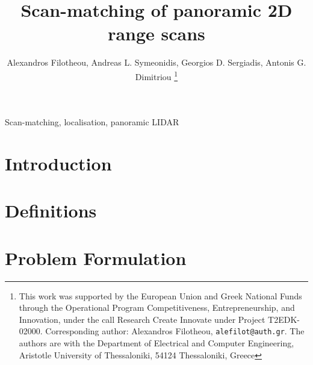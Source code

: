 \documentclass[letterpaper, 10 pt, conference]{ieeeconf}
\begin{document}
\title{\LARGE \bf Scan-matching of panoramic 2D range scans}


\author{Alexandros Filotheou, Andreas L. Symeonidis, Georgios D. Sergiadis, Antonis G. Dimitriou%
  \thanks{This work was supported by the European Union and Greek National Funds
  through the Operational Program Competitiveness, Entrepreneurship, and
  Innovation, under the call Research Create Innovate under Project T2EDK-02000.
  Corresponding author: Alexandros Filotheou, {\tt\small alefilot@auth.gr}.
  The authors are with the Department of Electrical and Computer Engineering,
  Aristotle University of Thessaloniki, 54124 Thessaloniki, Greece}
}

\maketitle
\thispagestyle{empty}
\pagestyle{empty}


\begin{abstract}
  
\end{abstract}

\begin{keywords}
Scan-matching, localisation, panoramic LIDAR
\end{keywords}

\section{Introduction}
  

\section{Definitions}
  \label{section:definitions}
  

\section{Problem Formulation}
  \label{section:the_problem}
  
\end{document}
